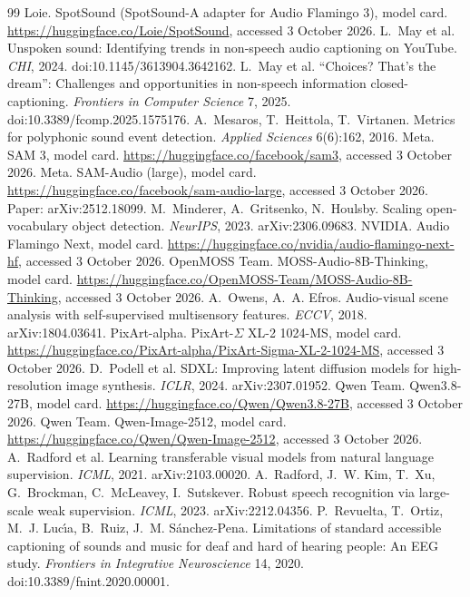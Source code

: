 \begin{thebibliography}{99}
 Loie. SpotSound (SpotSound-A adapter for Audio Flamingo 3), model card. \url{https://huggingface.co/Loie/SpotSound}, accessed 3 October 2026.
 L.~May et al. Unspoken sound: Identifying trends in non-speech audio captioning on YouTube. \emph{CHI}, 2024. doi:10.1145/3613904.3642162.
 L.~May et al. ``Choices? That's the dream'': Challenges and opportunities in non-speech information closed-captioning. \emph{Frontiers in Computer Science} 7, 2025. doi:10.3389/fcomp.2025.1575176.
 A.~Mesaros, T.~Heittola, T.~Virtanen. Metrics for polyphonic sound event detection. \emph{Applied Sciences} 6(6):162, 2016.
 Meta. SAM 3, model card. \url{https://huggingface.co/facebook/sam3}, accessed 3 October 2026.
 Meta. SAM-Audio (large), model card. \url{https://huggingface.co/facebook/sam-audio-large}, accessed 3 October 2026. Paper: arXiv:2512.18099.
 M.~Minderer, A.~Gritsenko, N.~Houlsby. Scaling open-vocabulary object detection. \emph{NeurIPS}, 2023. arXiv:2306.09683.
 NVIDIA. Audio Flamingo Next, model card. \url{https://huggingface.co/nvidia/audio-flamingo-next-hf}, accessed 3 October 2026.
 OpenMOSS Team. MOSS-Audio-8B-Thinking, model card. \url{https://huggingface.co/OpenMOSS-Team/MOSS-Audio-8B-Thinking}, accessed 3 October 2026.
 A.~Owens, A.~A. Efros. Audio-visual scene analysis with self-supervised multisensory features. \emph{ECCV}, 2018. arXiv:1804.03641.
 PixArt-alpha. PixArt-$\Sigma$ XL-2 1024-MS, model card. \url{https://huggingface.co/PixArt-alpha/PixArt-Sigma-XL-2-1024-MS}, accessed 3 October 2026.
 D.~Podell et al. SDXL: Improving latent diffusion models for high-resolution image synthesis. \emph{ICLR}, 2024. arXiv:2307.01952.
 Qwen Team. Qwen3.8-27B, model card. \url{https://huggingface.co/Qwen/Qwen3.8-27B}, accessed 3 October 2026.
 Qwen Team. Qwen-Image-2512, model card. \url{https://huggingface.co/Qwen/Qwen-Image-2512}, accessed 3 October 2026.
 A.~Radford et al. Learning transferable visual models from natural language supervision. \emph{ICML}, 2021. arXiv:2103.00020.
 A.~Radford, J.~W. Kim, T.~Xu, G.~Brockman, C.~McLeavey, I.~Sutskever. Robust speech recognition via large-scale weak supervision. \emph{ICML}, 2023. arXiv:2212.04356.
 P.~Revuelta, T.~Ortiz, M.~J. Luc\'{\i}a, B.~Ruiz, J.~M. S\'anchez-Pena. Limitations of standard accessible captioning of sounds and music for deaf and hard of hearing people: An EEG study. \emph{Frontiers in Integrative Neuroscience} 14, 2020. doi:10.3389/fnint.2020.00001.

\end{thebibliography}
